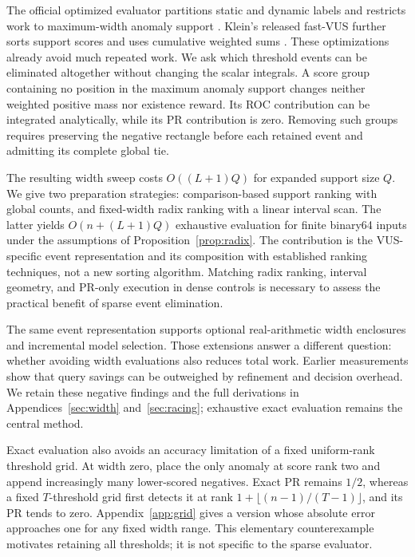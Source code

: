\documentclass[10pt]{article}
\begin{document}
The official optimized evaluator partitions static and dynamic labels and
restricts work to maximum-width anomaly support \cite{boniol2025}.
Klein's released fast-VUS further sorts support scores and uses cumulative
weighted sums \cite{klein2026}. These optimizations already avoid much repeated
work. We ask which threshold events can be eliminated altogether without
changing the scalar integrals. A score group containing no position in the
maximum anomaly support changes neither weighted positive mass nor existence
reward. Its ROC contribution can be integrated analytically, while its PR
contribution is zero. Removing such groups requires preserving the negative
rectangle before each retained event and admitting its complete global tie.

The resulting width sweep costs $O((L+1)Q)$ for expanded support size $Q$.
We give two preparation strategies: comparison-based support ranking with
global counts, and fixed-width radix ranking with a linear interval scan.
The latter yields $O(n+(L+1)Q)$ exhaustive evaluation for finite binary64
inputs under the assumptions of Proposition~\ref{prop:radix}. The contribution
is the VUS-specific event representation and its composition with established
ranking techniques, not a new sorting algorithm. Matching radix ranking,
interval geometry, and PR-only execution in dense controls is necessary to
assess the practical benefit of sparse event elimination.

The same event representation supports optional real-arithmetic width
enclosures and incremental model selection. Those extensions answer a
different question: whether avoiding width evaluations also reduces total
work. Earlier measurements show that query savings can be outweighed by
refinement and decision overhead. We retain these negative findings and the
full derivations in Appendices~\ref{sec:width} and~\ref{sec:racing}; exhaustive
exact evaluation remains the central method.

Exact evaluation also avoids an accuracy limitation of a fixed uniform-rank
threshold grid. At width zero, place the only anomaly at score rank two and
append increasingly many lower-scored negatives. Exact PR remains $1/2$,
whereas a fixed $T$-threshold grid first detects it at rank
$1+\lfloor(n-1)/(T-1)\rfloor$, and its PR tends to zero. Appendix~\ref{app:grid}
gives a version whose absolute error approaches one for any fixed width range.
This elementary counterexample motivates retaining all thresholds; it is not
specific to the sparse evaluator.
\end{document}
